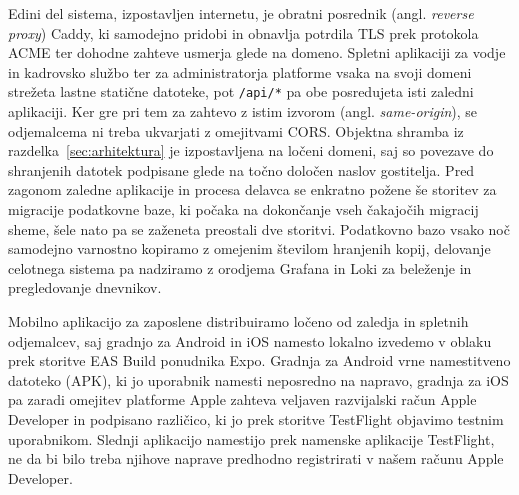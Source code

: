 Edini del sistema, izpostavljen internetu, je obratni posrednik (angl. \textit{reverse proxy}) Caddy, ki samodejno pridobi in obnavlja potrdila TLS prek protokola ACME ter dohodne zahteve usmerja glede na domeno. Spletni aplikaciji za vodje in kadrovsko službo ter za administratorja platforme vsaka na svoji domeni strežeta lastne statične datoteke, pot \texttt{/api/*} pa obe posredujeta isti zaledni aplikaciji. Ker gre pri tem za zahtevo z istim izvorom (angl. \textit{same-origin}), se odjemalcema ni treba ukvarjati z omejitvami CORS. Objektna shramba iz razdelka~\ref{sec:arhitektura} je izpostavljena na ločeni domeni, saj so povezave do shranjenih datotek podpisane glede na točno določen naslov gostitelja. Pred zagonom zaledne aplikacije in procesa delavca se enkratno požene še storitev za migracije podatkovne baze, ki počaka na dokončanje vseh čakajočih migracij sheme, šele nato pa se zaženeta preostali dve storitvi. Podatkovno bazo vsako noč samodejno varnostno kopiramo z omejenim številom hranjenih kopij, delovanje celotnega sistema pa nadziramo z orodjema Grafana in Loki za beleženje in pregledovanje dnevnikov.

Mobilno aplikacijo za zaposlene distribuiramo ločeno od zaledja in spletnih odjemalcev, saj gradnjo za Android in iOS namesto lokalno izvedemo v oblaku prek storitve EAS Build ponudnika Expo. Gradnja za Android vrne namestitveno datoteko (APK), ki jo uporabnik namesti neposredno na napravo, gradnja za iOS pa zaradi omejitev platforme Apple zahteva veljaven razvijalski račun Apple Developer in podpisano različico, ki jo prek storitve TestFlight objavimo testnim uporabnikom. Slednji aplikacijo namestijo prek namenske aplikacije TestFlight, ne da bi bilo treba njihove naprave predhodno registrirati v našem računu Apple Developer.
